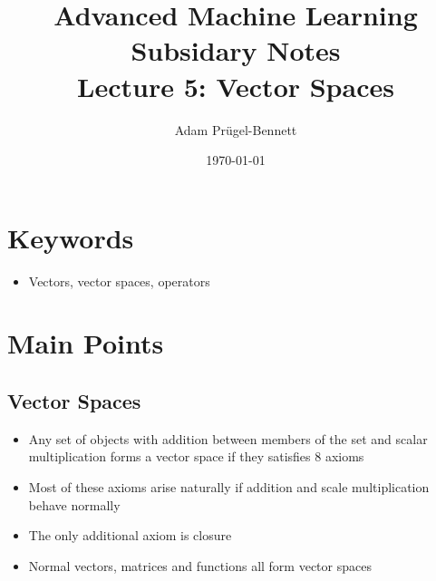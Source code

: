 \documentclass[11pt]{article}
\author{Adam Prügel-Bennett}
\date{\today}
\title{Advanced Machine Learning Subsidary Notes\\\medskip
\large Lecture 5: Vector Spaces}
\begin{document}
\maketitle



\section{Keywords}
\label{sec:orga4e4ae1}
\begin{itemize}
\item Vectors, vector spaces, operators
\end{itemize}

\section{Main Points}
\label{sec:org5b8e772}

\subsection{Vector Spaces}
\label{sec:orgfef20bd}
\begin{itemize}
\item Any set of objects with addition between members of the set and
scalar multiplication forms a vector space if they satisfies 8 axioms
\item Most of these axioms arise naturally if addition and scale multiplication
behave normally
\item The only additional axiom is closure
\item Normal vectors, matrices and functions all form vector spaces
\end{itemize}
\end{document}
